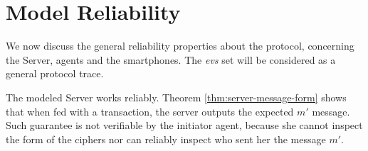\section{Model Reliability}
We now discuss the general reliability properties about the protocol, concerning the Server, agents and the smartphones. The \textit{evs} set will be considered as a general protocol trace.

The modeled Server works reliably. Theorem \ref{thm:server-message-form} shows that when fed with a transaction, the server outputs the expected \(m'\) message. Such guarantee is not verifiable by the initiator agent, because she cannot inspect the form of the ciphers nor can reliably inspect who sent her the message \(m'\).